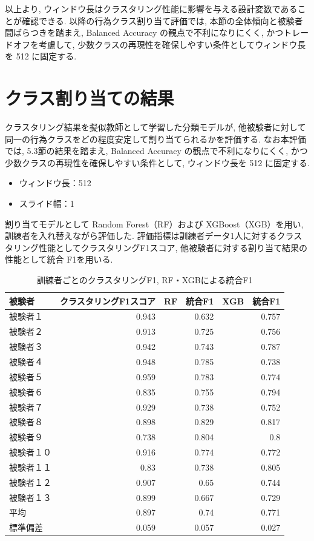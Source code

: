 \documentclass[a4paper,12pt]{jreport}
\begin{document}
以上より, ウィンドウ長はクラスタリング性能に影響を与える設計変数であることが確認できる. 以降の行為クラス割り当て評価では, 本節の全体傾向と被験者間ばらつきを踏まえ, Balanced Accuracy の観点で不利になりにくく, かつトレードオフを考慮して, 少数クラスの再現性を確保しやすい条件としてウィンドウ長を 512 に固定する. 


\section{クラス割り当ての結果}
クラスタリング結果を擬似教師として学習した分類モデルが, 他被験者に対して同一の行為クラスをどの程度安定して割り当てられるかを評価する. なお本評価では, 5.3節の結果を踏まえ, Balanced Accuracy の観点で不利になりにくく, かつ少数クラスの再現性を確保しやすい条件として, ウィンドウ長を 512 に固定する. 
\begin{itemize}
    \item ウィンドウ長：512
    \item スライド幅：1
\end{itemize}
割り当てモデルとして Random Forest（RF）および XGBoost（XGB）を用い, 訓練者を入れ替えながら評価した. 評価指標は訓練者データ1人に対するクラスタリング性能としてクラスタリングF1スコア, 他被験者に対する割り当て結果の性能として統合 F1を用いる. 

\begin{table}[tb]
  \centering
  \caption{訓練者ごとのクラスタリングF1, RF・XGBによる統合F1}
  \label{tab:tr_class_F1}
  \renewcommand{\arraystretch}{1.2}
  \small
  \begin{tabular}{|l|r|r|r|}
    \hline
    被験者 & クラスタリングF1スコア & RF　統合F1 & XGB　統合F1 \\ \hline
被験者１ & 0.943 & 0.632 & 0.757 \\ \hline
被験者２ & 0.913 & 0.725 & 0.756 \\ \hline
被験者３ & 0.942 & 0.743 & 0.787 \\ \hline
被験者４ & 0.948 & 0.785 & 0.738 \\ \hline
被験者５ & 0.959 & 0.783 & 0.774 \\ \hline
被験者６ & 0.835 & 0.755 & 0.794 \\ \hline
被験者７ & 0.929 & 0.738 & 0.752 \\ \hline
被験者８ & 0.898 & 0.829 & 0.817 \\ \hline
被験者９ & 0.738 & 0.804 & 0.8 \\ \hline
被験者１０ & 0.916 & 0.774 & 0.772 \\ \hline
被験者１１ & 0.83 & 0.738 & 0.805 \\ \hline
被験者１２ & 0.907 & 0.65 & 0.744 \\ \hline
被験者１３ & 0.899 & 0.667 & 0.729 \\ \hline
平均 & 0.897 & 0.74 & 0.771 \\ \hline
標準偏差 & 0.059 & 0.057 & 0.027 \\ \hline
  \end{tabular}
\end{table}
\end{document}
